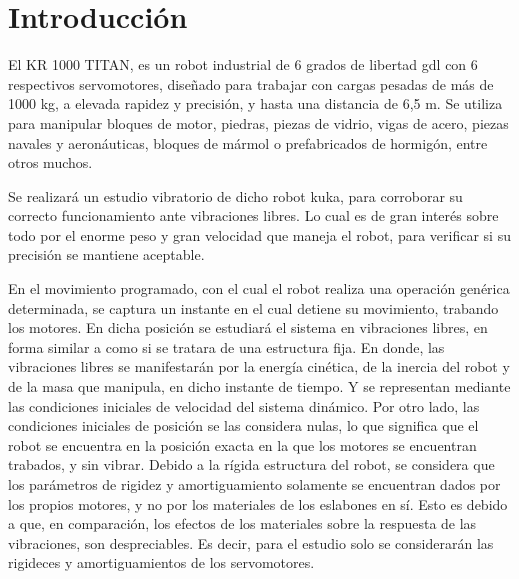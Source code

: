 \documentclass{aleph-revista}
\begin{document}
\membrete

\section{Introducción}
El KR 1000 TITAN, es un robot industrial de 6 grados de libertad gdl  con 6 respectivos servomotores, diseñado para trabajar con cargas pesadas de más de 1000 kg, a elevada rapidez y precisión, y hasta una distancia de 6,5 m. Se utiliza para manipular bloques de motor, piedras, piezas de vidrio, vigas de acero, piezas navales y aeronáuticas, bloques de mármol o prefabricados de hormigón, entre otros muchos.

Se realizará un estudio vibratorio de dicho robot kuka, para corroborar su correcto funcionamiento ante vibraciones libres. Lo cual es de gran interés sobre todo por el enorme peso y gran velocidad que maneja el robot, para verificar si su precisión se mantiene aceptable.

En el movimiento programado, con el cual el robot realiza una operación genérica determinada, se captura un instante en el cual detiene su movimiento, trabando los motores. En dicha posición se estudiará el sistema en vibraciones libres, en forma similar a como si se tratara de una estructura fija. En donde, las vibraciones libres se manifestarán por la energía cinética, de la inercia del robot y de la masa que manipula, en dicho instante de tiempo. Y se representan mediante las condiciones iniciales de velocidad del sistema dinámico. Por otro lado, las condiciones iniciales de posición se las considera nulas, lo que significa que el robot se encuentra en la posición exacta en la que los motores se encuentran trabados, y sin vibrar.
Debido a la rígida estructura del robot, se considera que los parámetros de rigidez y amortiguamiento solamente se encuentran dados por los propios motores, y no por los materiales de los eslabones en sí. Esto es debido a que, en comparación, los efectos de los materiales sobre la respuesta de las vibraciones, son despreciables. Es decir, para el estudio solo se considerarán las rigideces y amortiguamientos de los servomotores.
\end{document}
